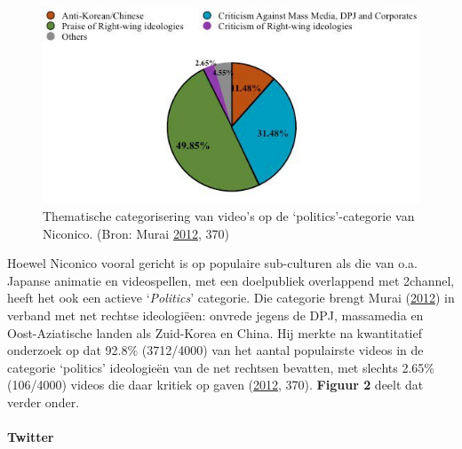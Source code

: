 \documentclass[10.5pt,dutch,]{article}
\let\oldparagraph\paragraph
\renewcommand{\paragraph}[1]{\oldparagraph{#1}\mbox{}}
\begin{document}
\begin{figure}[htbp]
\centering
\includegraphics{images/murai_2012_nico.jpg}
\caption{Thematische categorisering van video's op de
`politics'-categorie van Niconico. (Bron: Murai
\protect\hyperlink{ref-muraiux5fnetux5f2012}{2012}, 370)}
\end{figure}

Hoewel Niconico vooral gericht is op populaire sub-culturen als die van
o.a. Japanse animatie en videospellen, met een doelpubliek overlappend
met 2channel, heeft het ook een actieve `\emph{Politics}' categorie. Die
categorie brengt Murai
(\protect\hyperlink{ref-muraiux5fnetux5f2012}{2012}) in verband met net
rechtse ideologiëen: onvrede jegens de DPJ, massamedia en
Oost-Aziatische landen als Zuid-Korea en China. Hij merkte na
kwantitatief onderzoek op dat 92.8\% (3712/4000) van het aantal
populairste videos in de categorie `politics' ideologieën van de net
rechtsen bevatten, met slechts 2.65\% (106/4000) videos die daar kritiek
op gaven (\protect\hyperlink{ref-muraiux5fnetux5f2012}{2012}, 370).
\textbf{Figuur 2} deelt dat verder onder.

\paragraph{Twitter}\label{twitter}
\end{document}
